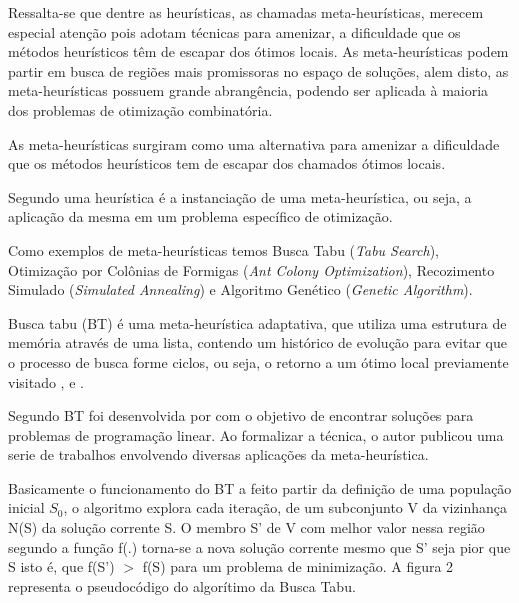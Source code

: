 Ressalta-se que dentre as heurísticas, as chamadas meta-heurísticas, merecem especial atenção pois adotam técnicas para amenizar, a dificuldade que os métodos heurísticos têm de escapar dos ótimos locais. As meta-heurísticas podem partir em busca de regiões mais promissoras no espaço de soluções, alem disto, as meta-heurísticas possuem grande abrangência, podendo ser aplicada à maioria dos problemas de otimização combinatória.\cite{nascimento2005aplicaccao}\par

As meta-heurísticas surgiram como uma alternativa para amenizar a dificuldade que os métodos heurísticos tem de escapar dos chamados ótimos locais.\cite{nascimento2005aplicaccao}

Segundo \cite{adrianocesar} uma heurística é a instanciação de uma meta-heurística, ou seja, a aplicação da mesma em um problema específico de otimização.\par

Como exemplos de meta-heurísticas temos Busca Tabu (\textit{Tabu Search}), Otimização por Colônias de Formigas (\textit{Ant Colony Optimization}), Recozimento Simulado (\textit{Simulated Annealing}) e Algoritmo Genético (\textit{Genetic Algorithm}).\par


Busca tabu (BT) é uma meta-heurística adaptativa, que utiliza uma estrutura de memória através de uma lista, contendo um histórico de evolução para evitar que o processo de busca forme ciclos, ou seja, o retorno a um ótimo local previamente visitado \cite{souza2000} , \cite{armentanointroduccao} e \cite{subramanian2006aplicaccao}.\par


Segundo \cite{subramanian2006aplicaccao} BT foi desenvolvida por \cite{glover1986future} com o objetivo de encontrar soluções para problemas de programação linear. Ao formalizar a técnica, o autor publicou uma serie de trabalhos envolvendo diversas aplicações da meta-heurística. \par

Basicamente o funcionamento do BT a feito partir da definição de uma população inicial ${S_0}$, o algoritmo explora cada iteração, de um subconjunto V da vizinhança N(S) da solução corrente S. O membro S’ de V com melhor valor nessa região segundo a função f(.) torna-se a nova solução corrente mesmo que S’ seja pior que S isto é, que f(S’) $>$ f(S) para um problema de minimização\cite{souza2000}. A figura 2 representa o pseudocódigo do algorítimo da Busca Tabu.

